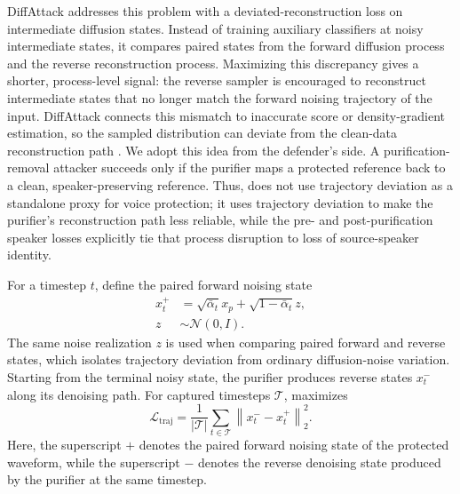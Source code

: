DiffAttack addresses this problem with a deviated-reconstruction loss on intermediate diffusion states. 
Instead of training auxiliary classifiers at noisy intermediate states, it compares paired states from the forward diffusion process and the reverse reconstruction process. 
Maximizing this discrepancy gives a shorter, process-level signal: the reverse sampler is encouraged to reconstruct intermediate states that no longer match the forward noising trajectory of the input. 
DiffAttack connects this mismatch to inaccurate score or density-gradient estimation, so the sampled distribution can deviate from the clean-data reconstruction path \cite{kang2023diffattack}. 
We adopt this idea from the defender's side. A purification-removal attacker succeeds only if the purifier maps a protected reference back to a clean, speaker-preserving reference. 
Thus, \method{} does not use trajectory deviation as a standalone proxy for voice protection; it uses trajectory deviation to make the purifier's reconstruction path less reliable, while the pre- and post-purification speaker losses explicitly tie that process disruption to loss of source-speaker identity.

For a timestep $t$, define the paired forward noising state
\begin{equation}
    \begin{aligned}
    x_t^{+}
    &=
    \sqrt{\bar{\alpha}_t}x_p
    +
    \sqrt{1-\bar{\alpha}_t}z,\\
    z&\sim\mathcal{N}(0,I).
    \end{aligned}
\end{equation}
The same noise realization $z$ is used when comparing paired forward and reverse states, which isolates trajectory deviation from ordinary diffusion-noise variation.
Starting from the terminal noisy state, the purifier produces reverse states $x_t^{-}$ along its denoising path. For captured timesteps $\mathcal{T}$, \method{} maximizes
\begin{equation}
    \mathcal{L}_{\text{traj}}
    =
    \frac{1}{|\mathcal{T}|}
    \sum_{t\in\mathcal{T}}
    \left\|x_t^{-}-x_t^{+}\right\|_2^2 .
    \label{eq:traj_loss}
\end{equation}
Here, the superscript $+$ denotes the paired forward noising state of the protected waveform, while the superscript $-$ denotes the reverse denoising state produced by the purifier at the same timestep.

